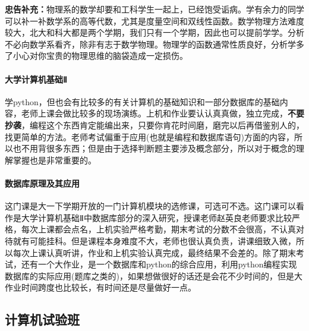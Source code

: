 \documentclass[
decoration,  %
]{qyxf-book}
\begin{document}
\textbf{忠告补充：}物理系的数学却要和工科学生一起上，已经饱受诟病。学有余力的同学可以补一补数学系的高等代数，尤其是度量空间和双线性函数。数学物理方法难度较大，北大和科大都是两个学期，我们只有一个学期，因此也可以提前学学。分析不必向数学系看齐，除非有志于数学物理。物理学的函数通常性质良好，分析学多了小心对你宝贵的物理思维的脑袋造成一定损伤。

\paragraph{大学计算机基础Ⅱ}
学python，但也会有比较多的有关计算机的基础知识和一部分数据库的基础内容，老师上课会做比较多的现场演练。上机和作业要认认真真做，独立完成，\textbf{不要抄袭}，编程这个东西肯定能编出来，只要你肯花时间磨，磨完以后再借鉴别人的，找更简单的方法。老师考试偏重于应用(也就是编程和数据库语句)方面的内容，所以也不用背很多东西；但是由于选择判断题主要涉及概念部分，所以对于概念的理解掌握也是非常重要的。

\paragraph{数据库原理及其应用}
这门课是大一下学期开放的一门计算机模块的选修课，可选可不选。这门课可以看作是大学计算机基础Ⅱ中数据库部分的深入研究，授课老师赵英良老师要求比较严格，每次上课都会点名，上机实验严格考勤，期末考试的分数不会很高，不认真对待就有可能挂科。但是课程本身难度不大，老师也很认真负责，讲课细致入微，所以每次上课认真听讲，作业和上机实验认真完成，最终结果不会差的。除了期末考试，还有一个大作业，是一个数据库和python的综合应用，利用python编程实现数据库的实际应用(题库之类的)，如果想做很好的话还是会花不少时间的，但是大作业时间跨度也比较长，有时间还是尽量做好一点。

\subsection{计算机试验班}
\end{document}
